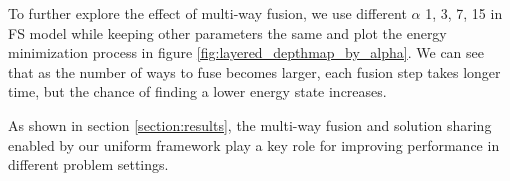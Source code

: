 To further explore the effect of multi-way fusion, we use different $\alpha$ {1, 3, 7, 15} in FS model while keeping other parameters the same and plot the energy minimization process in figure \ref{fig:layered_depthmap_by_alpha}. We can see that as the number of ways to fuse becomes larger, each fusion step takes longer time, but the chance of finding a lower energy state increases.

As shown in section \ref{section:results}, the multi-way fusion and solution sharing enabled by our uniform framework play a key role for improving performance in different problem settings.

